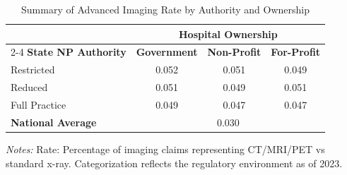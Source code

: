 \begin{table}[htbp]
    \centering
    \caption{Summary of Advanced Imaging Rate by Authority and Ownership}
    \label{tab:partb_imaging_adv_rate_own}
    \vspace{0.2cm}
    \begin{tabular}{lccc}
        \toprule
        & \multicolumn{3}{c}{\textbf{Hospital Ownership}} \\
        \cmidrule(lr){2-4}
        \textbf{State NP Authority} & \textbf{Government} & \textbf{Non-Profit} & \textbf{For-Profit} \\
        \midrule
        Restricted & 0.052 & 0.051 & 0.049 \\
        Reduced & 0.051 & 0.049 & 0.051 \\
        Full Practice & 0.049 & 0.047 & 0.047 \\
        \midrule
        \textbf{National Average} & \multicolumn{3}{c}{0.030} \\
        \bottomrule
    \end{tabular}
    \vspace{0.1cm}
    \begin{minipage}{0.85\textwidth}
        \footnotesize \textit{Notes:} Rate: Percentage of imaging claims representing CT/MRI/PET vs standard x-ray. Categorization reflects the regulatory environment as of 2023.
    \end{minipage}
\end{table}